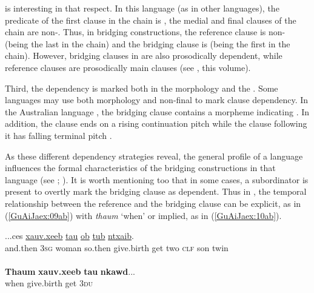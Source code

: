 \documentclass[output=paper]{LSP/langsci}
\begin{document}
 is interesting in that respect. In this language (as in other  languages), the predicate of the first clause in the chain is , the medial and final clauses of the chain are non-. Thus, in  bridging constructions, the reference clause is non- (being the last in the chain) and the bridging clause is  (being the first in the chain). However, bridging clauses in  are also prosodically dependent, while reference clauses are prosodically main clauses (see \citeauthor{sarvasy18}, this volume).

Third, the dependency is marked both in the morphology and the . Some languages may use both morphology and non-final  to mark clause dependency. In the Australian language , the bridging clause contains a morpheme indicating . In addition, the clause ends on a rising continuation pitch while the clause following it has falling terminal pitch \citep[99]{heath1985}. 

As these different dependency strategies reveal, the general profile of a language influences the formal characteristics of the bridging constructions in that language (see  \citealt{devries.2005}; \citealt[][898]{seifart10}). It is worth mentioning too that in some cases, a subordinator is present to overtly mark the bridging clause as dependent. Thus in , the temporal relationship between the reference and the bridging clause can be explicit, as in (\ref{GuAiJaex:09ab}) with \textit{thaum} `when' or implied, as in (\ref{GuAiJaex:10ab}). 


\begin{exe}
\ex \label{GuAiJaex:09ab}
\begin{xlist}
\ex \label{GuAiJaex:09a}
\gll ...ces \underline{} \underline{} \underline{} \underline{xauv.xeeb} \underline{tau} \underline{ob} \underline{} \underline{tub} \underline{ntxaib}.\\
and.then \textsc{3sg} woman so.then give.birth get two \textsc{clf} son twin\\
\glt {}\\
\ex \label{GuAiJaex:09b}
\gll \textbf{Thaum} \textbf{xauv.xeeb} \textbf{tau} \textbf{nkawd}...\\     	      
    when  give.birth get \textsc{3du}\\
\glt {} 
\end{xlist}
\end{exe}
\end{document}
